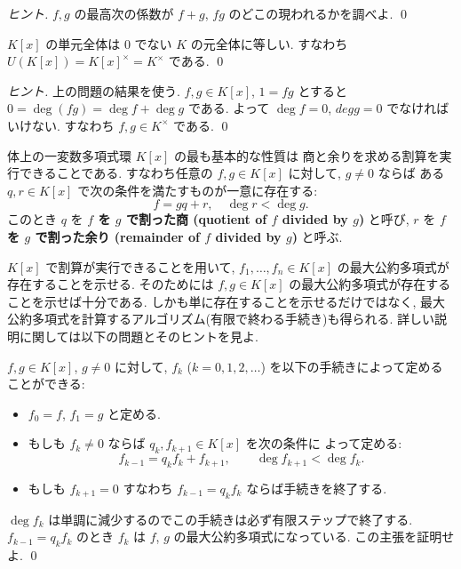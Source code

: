 \documentclass[12pt,twoside]{jarticle}
\begin{document}
\begin{proof}[ヒント]
 $f,g$ の最高次の係数が $f+g$, $fg$ のどこの現われるかを調べよ. 
 \qed
\end{proof}


\begin{question}[多項式環の単元, 5点]
 $K[x]$ の単元全体は $0$ でない $K$ の元全体に等しい.
 すなわち $U(K[x])=K[x]^\times=K^\times$ である.
 \qed
\end{question}

\begin{proof}[ヒント]
 上の問題の結果を使う.
 $f,g\in K[x]$, $1=fg$ とすると $0=\deg(fg)=\deg f+\deg g$ である.
 よって $\deg f=0$, $deg g=0$ でなければいけない.
 すなわち $f,g\in K^\times$ である.
 \qed
\end{proof}


体上の一変数多項式環 $K[x]$ の最も基本的な性質は
商と余りを求める割算を実行できることである.
すなわち任意の $f,g\in K[x]$ に対して, $g\ne 0$ ならば
ある $q,r\in K[x]$ で次の条件を満たすものが一意に存在する:
\begin{equation*}
 f = gq + r, \quad \deg r < \deg g.
\end{equation*}
このとき $q$ を %
{\bf $f$ を $g$ で割った商 (quotient of $f$ divided by $g$)} と呼び, 
$r$ を %
{\bf $f$ を $g$ で割った余り (remainder of $f$ divided by $g$)} 
と呼ぶ.


$K[x]$ で割算が実行できることを用いて, 
$f_1,\ldots,f_n\in K[x]$ の最大公約多項式が存在することを示せる.
そのためには $f,g\in K[x]$ の最大公約多項式が存在することを示せば十分である.
しかも単に存在することを示せるだけではなく, 
最大公約多項式を計算するアルゴリズム(有限で終わる手続き)も得られる.
詳しい説明に関しては以下の問題とそのヒントを見よ.

\begin{question}
\label{q:Euclidean-algorithm-1-K[x]}
  $f,g\in K[x]$, $g\ne 0$ に対して, 
  $f_k$ ($k=0,1,2,\dots$) を以下の手続きによって定めることができる:
  \begin{itemize}
  \item $f_0=f$, $f_1=g$ と定める.
  \item もしも $f_k\ne 0$ ならば $q_k, f_{k+1}\in K[x]$ を次の条件に
    よって定める:
    \begin{equation*}
      f_{k-1} = q_k f_k + f_{k+1}, \qquad \deg f_{k+1} < \deg f_k.
    \end{equation*}
  \item もしも $f_{k+1}=0$ すなわち $f_{k-1}=q_kf_k$ ならば手続きを終了する.
  \end{itemize}
  $\deg f_k$ は単調に減少するのでこの手続きは必ず有限ステップで終了する.
  $f_{k-1}=q_kf_k$ のとき $f_k$ は $f$, $g$ の最大公約多項式になっている.
  この主張を証明せよ.
  \qed
\end{question}
\end{document}
